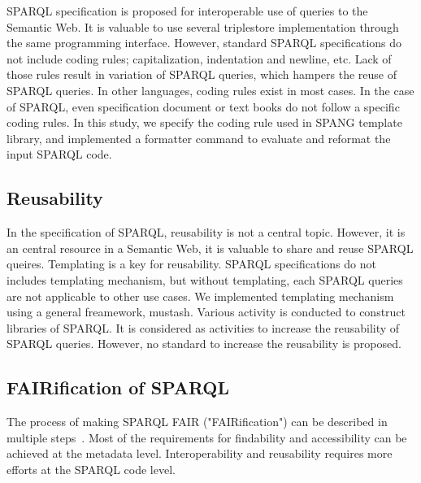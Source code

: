\documentclass[runningheads]{llncs}
\begin{document}
SPARQL specification is proposed for interoperable use of queries to the Semantic Web. 
It is valuable to use several triplestore implementation through the same programming interface. 
However, standard SPARQL specifications do not include coding rules; capitalization, indentation and newline, etc. 
Lack of those rules result in variation of SPARQL queries, which hampers the reuse of SPARQL queries. 
In other languages, coding rules exist in most cases. 
In the case of SPARQL, even specification document or text books do not follow a specific coding rules. 
In this study, we specify the coding rule used in SPANG template library, and implemented a formatter command to evaluate and reformat the input SPARQL code.

\subsection{Reusability}
In the specification of SPARQL, reusability is not a central topic. 
However, it is an central resource in a Semantic Web, it is valuable to share and reuse SPARQL queires.
Templating is a key for reusability. 
SPARQL specifications do not includes templating mechanism, but without templating, each SPARQL queries are not applicable to other use cases. 
We implemented templating mechanism using a general freamework, mustash.
Various activity is conducted to construct libraries of SPARQL. 
It is considered as activities to increase the reusability of SPARQL queries. However, no standard to increase the reusability is proposed. 



\subsection{FAIRification of SPARQL}
The process of making SPARQL FAIR ("FAIRification") can be described in multiple steps~\cite{fairification}.
Most of the requirements for findability and accessibility can be achieved at the metadata level. 
Interoperability and reusability requires more efforts at the SPARQL code level.
\end{document}
